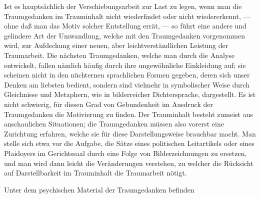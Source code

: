 \documentclass[twoside=true,titlepage=false,open=any, parskip=never, fontsize=10pt, headings=small, chapterprefix=false, appendixprefix=false]{scrbook}
\begin{document}
        \pstart
        Ist es hauptsächlich der Verschiebungsarbeit zur Last zu legen, wenn man die
               Traumgedanken im Trauminhalt nicht wiederfindet oder nicht
               wiedererkennt, — ohne daß man das Motiv solcher Entstellung errät, — so führt
               eine andere und gelindere Art der Umwandlung, welche mit den Traumgedanken
                  vorgenommen wird, zur Aufdeckung einer neuen, aber leichtverständlichen Leistung der Traumarbeit. Die nächsten Traumgedanken, welche man durch die Analyse entwickelt, fallen nämlich
               häufig durch ihre ungewöhnliche Einkleidung auf; sie scheinen nicht in den
               nüchternen sprachlichen Formen gegeben, deren sich unser Denken am liebsten
               bedient, sondern sind vielmehr in symbolischer Weise durch
               Gleichnisse und Metaphern, wie in bilderreicher Dichtersprache, dargestellt. Es
               ist nicht schwierig, für diesen Grad von Gebundenheit im Ausdruck der
               Traumgedanken die Motivierung zu finden. Der Trauminhalt besteht zumeist aus
               anschaulichen Situationen; die Traumgedanken müssen also vorerst eine Zurichtung
               erfahren, welche sie für diese Darstellungsweise brauchbar macht. Man stelle
               sich etwa vor die Aufgabe, die Sätze eines politischen Leitartikels oder
               eines Plaidoyers im Gerichtssaal durch eine Folge von Bilderzeichnungen zu
               ersetzen, und man wird dann leicht die Veränderungen verstehen, zu
               welcher die Rücksicht auf Darstellbarkeit im
                  Trauminhalt die Traumarbeit nötigt.
        \pend
    
            
        \pstart
        Unter dem psychischen Material der Traumgedanken befinden
        \pend
    
         
            
            
            
\end{document}
